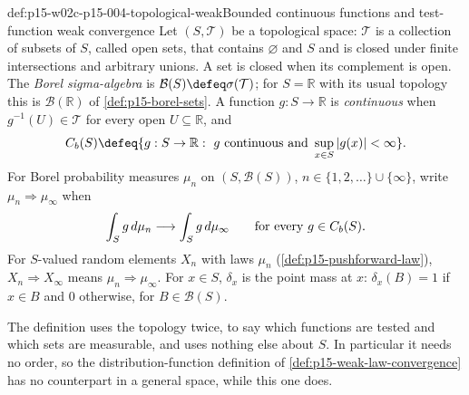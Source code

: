 \begin{hbdefinition}{def:p15-w02c-p15-004-topological-weak}{Bounded continuous functions and test-function weak convergence}
Let \((S,\mathcal T)\) be a topological space: \(\mathcal T\) is a
collection of subsets of \(S\), called open sets, that contains
\(\varnothing\) and \(S\) and is closed under finite intersections and
arbitrary unions. A set is closed when its complement is open. The
\emph{Borel sigma-algebra} is \(\mathcal B(S)\defeq\sigma(\mathcal T)\);
for \(S=\mathbb R\) with its usual topology this is
\(\mathcal B(\mathbb R)\) of \cref{def:p15-borel-sets}. A function
\(g:S\to\mathbb R\) is \emph{continuous} when \(g^{-1}(U)\in\mathcal T\)
for every open \(U\subseteq\mathbb R\), and
\[
 C_b(S)\defeq\{g:S\to\mathbb R:\ g\hbox{ continuous and }
               \sup_{x\in S}|g(x)|<\infty\}.
\]
For Borel probability measures \(\mu_n\) on \((S,\mathcal B(S))\),
\(n\in\{1,2,\ldots\}\cup\{\infty\}\), write
\(\mu_n\Rightarrow\mu_\infty\) when
\[
 \int_S g\,d\mu_n\longrightarrow\int_S g\,d\mu_\infty
 \qquad\hbox{for every }g\in C_b(S).
\]
For \(S\)-valued random elements \(X_n\) with laws \(\mu_n\)
(\cref{def:p15-pushforward-law}), \(X_n\Rightarrow X_\infty\) means
\(\mu_n\Rightarrow\mu_\infty\). For \(x\in S\), \(\delta_x\) is the
point mass at \(x\): \(\delta_x(B)=1\) if \(x\in B\) and \(0\)
otherwise, for \(B\in\mathcal B(S)\).
\end{hbdefinition}

The definition uses the topology twice, to say which functions are
tested and which sets are measurable, and uses nothing else about \(S\).
In particular it needs no order, so the distribution-function definition
of \cref{def:p15-weak-law-convergence} has no counterpart in a general
space, while this one does.

